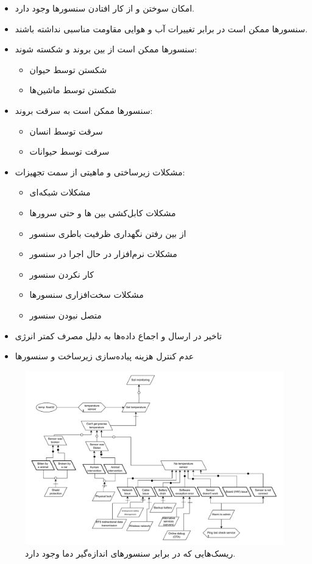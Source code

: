 \documentclass[a4paper]{report}
\begin{document}
\begin{itemize}
    \item امکان سوختن و از کار افتادن سنسور‌ها وجود دارد.
    \item سنسور‌ها ممکن است در برابر تغییرات آب و هوایی مقاومت مناسبی نداشته باشند.
    \item سنسور‌ها ممکن است از بین بروند و شکسته شوند:
    \begin{itemize}
        \item شکستن توسط حیوان
        \item شکستن توسط ماشین‌ها
    \end{itemize}
    \item سنسور‌ها ممکن است به سرقت بروند:
    \begin{itemize}
        \item سرقت توسط انسان
        \item سرقت توسط حیوانات
    \end{itemize}
    \item مشکلات زیرساختی و ماهیتی از سمت تجهیزات:
    \begin{itemize}
        \item مشکلات شبکه‌ای
        \item مشکلات کابل‌کشی بین ها و حتی سرور‌ها
        \item از بین رفتن نگهداری ظرفیت باطری سنسور
        \item مشکلات نرم‌افزار در حال اجرا در سنسور
        \item کار نکردن سنسور
        \item مشکلات سخت‌افزاری سنسور‌ها
        \item متصل نبودن سنسور
    \end{itemize}
    \item تاخیر در ارسال و اجماع داده‌ها به دلیل مصرف کمتر انرژی
    \item عدم کنترل هزینه پیاده‌سازی زیرساخت و سنسور‌ها
\end{itemize}

\begin{figure}[H]
    \centering
    \includegraphics[width=1.0\textwidth]{assets/diagrams/risk_soil_monitoring.drawio.pdf}
    \caption{ریسک‌هایی که در برابر سنسور‌های اندازه‌گیر دما وجود دارد.}
\end{figure}
\end{document}
